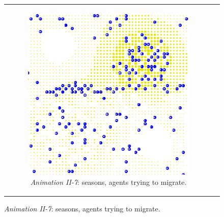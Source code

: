 \begin{figure}[H]
\begin{center}
	
	\begin{tabular}{c c}
		\begin{subfigure}[b]{0.4\textwidth}
			\centering
			\includegraphics[width=1\textwidth, angle=0]{./fig/background/abs/sugarscape_seasons.png}
			\caption{\textit{Animation II-7}: seasons, agents trying to migrate.}
			\label{fig:sugarscape_visualisation_seasons}
		\end{subfigure}	
		
		& 
		

\end{tabular}
\end{center}
\end{figure}
